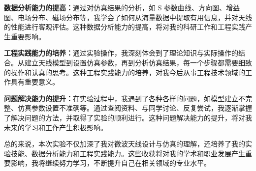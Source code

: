 \documentclass[12pt,hyperref,a4paper,UTF8]{ctexart}
\begin{document}
\textbf{数据分析能力的提高：}通过对仿真结果的分析，如 S 参数曲线、方向图、增益图、电场分布、磁场分布等，我学会了如何从海量数据中提取有用信息，并对天线的性能进行客观评估。这种数据分析能力的提高，将对我的科研工作和工程实践产生重要影响。

\textbf{工程实践能力的培养：}通过实验操作，我深刻体会到了理论知识与实际操作的结合。从建立天线模型到设置仿真参数，再到分析仿真结果，每一个步骤都需要细致的操作和认真的思考。这种工程实践能力的培养，对我今后从事工程技术领域的工作具有重要意义。

\textbf{问题解决能力的提升：}在实验过程中，我遇到了各种各样的问题，如模型建立不完整、仿真参数设置不准确等。通过查阅资料、与同学讨论、反复尝试，我逐渐掌握了解决问题的方法，并取得了实验的顺利进行。这种问题解决能力的提升，将对我未来的学习和工作产生积极影响。

总的来说，本次实验不仅加深了我对微波天线设计与仿真的理解，还培养了我的实验技能、数据分析能力和工程实践能力。这些收获将对我的学术和职业发展产生重要影响，我将继续努力学习，不断提升自己在相关领域的专业水平。


\end{document}
